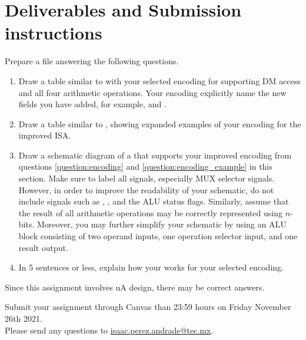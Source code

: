 \documentclass[number=03]{assignment}
\newcommand{\deadline}{23:59 hours on Friday November 26th 2021}
\begin{document}
\section{Deliverables and Submission instructions}\label{Sec:Deliverables}
Prepare a  file answering the following questions.
\begin{enumerate}
\item {} Draw a table similar to  with your selected encoding for supporting \ac{DM} access and all four arithmetic operations.
Your encoding  explicitly name the new fields you have added, for example,  and .\label{question:encoding}
\item {} Draw a table similar to , showing  expanded examples of your encoding for the improved \ac{ISA}.\label{question:encoding_example}
\item {} Draw a schematic diagram of a \uA that supports your improved encoding from questions \ref{question:encoding} and \ref{question:encoding_example} in this section.
Make sure to label all signals, especially \ac{MUX} selector signals. 
However, in order to improve the readability of your schematic, do not include signals such as , , and the \ac{ALU} status flags.
Similarly, assume that the result of all arithmetic operations may be correctly represented using $n$-bits.
Moreover, you may further simplify your schematic by using an \ac{ALU} block consisting of two operand inputs, one operation selector input, and one result output.
\item {} In 5 sentences or less, explain how your \uA works for your selected encoding.
\end{enumerate} 


Since this assignment involves \ac{uA} design, there may be  correct answers.

Submit your assignment through Canvas  than \deadline. 
\\

Please send any questions to \href{mailto:isaac.perez.andrade@tec.mx}{isaac.perez.andrade@tec.mx}.
\end{document}
